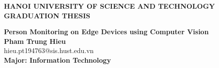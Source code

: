 \documentclass[main.tex]{subfiles}
\begin{document}
\begin{titlepage}
\thispagestyle{empty}
\begin{center}

{\textbf{\large{HANOI UNIVERSITY OF SCIENCE AND TECHNOLOGY}}}\\[4cm]

{\textbf{\huge{GRADUATION THESIS}}}\\[1cm]
{\textbf{\Large{Person Monitoring on Edge Devices using Computer Vision}}\\[1cm]

{\textbf{\large{Pham Trung Hieu}}}\\
{\large{hieu.pt194763@sis.hust.edu.vn}}\\[0.5cm]

{\textbf{\large{Major: Information Technology}}}\\

\vspace{2cm}
\begin{table}[H]
\centering
{}
\end{table}}
\end{center}



\end{titlepage}
\end{document}
